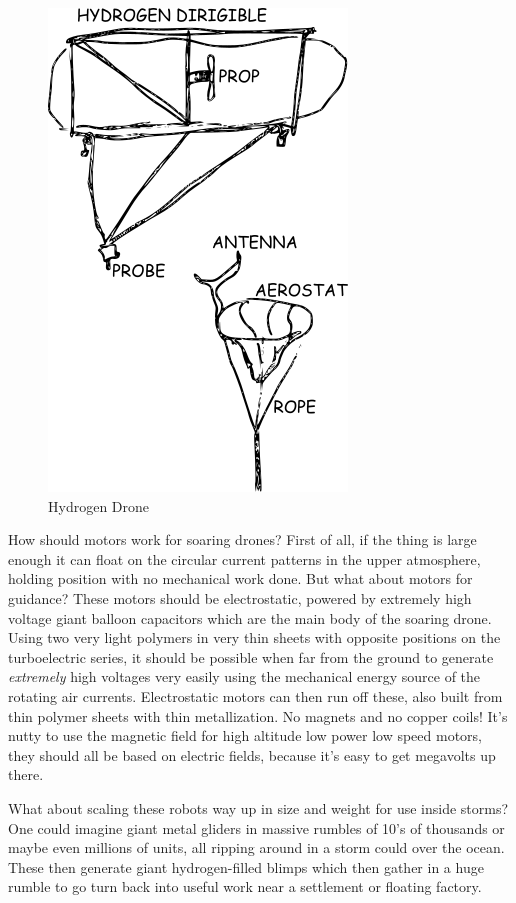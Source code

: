 \begin{figure}[htbp]
\centering
\includegraphics{images/dirigible.png}
\caption{Hydrogen Drone}
\end{figure}

How should motors work for soaring drones? First of all, if the thing is
large enough it can float on the circular current patterns in the upper
atmosphere, holding position with no mechanical work done. But what
about motors for guidance? These motors should be electrostatic, powered
by extremely high voltage giant balloon capacitors which are the main
body of the soaring drone. Using two very light polymers in very thin
sheets with opposite positions on the turboelectric series, it should be
possible when far from the ground to generate \emph{extremely} high
voltages very easily using the mechanical energy source of the rotating
air currents. Electrostatic motors can then run off these, also built
from thin polymer sheets with thin metallization. No magnets and no
copper coils! It's nutty to use the magnetic field for high altitude low
power low speed motors, they should all be based on electric fields,
because it's easy to get megavolts up there.

What about scaling these robots way up in size and weight for use inside
storms? One could imagine giant metal gliders in massive rumbles of 10's
of thousands or maybe even millions of units, all ripping around in a
storm could over the ocean. These then generate giant hydrogen-filled
blimps which then gather in a huge rumble to go turn back into useful
work near a settlement or floating factory.

